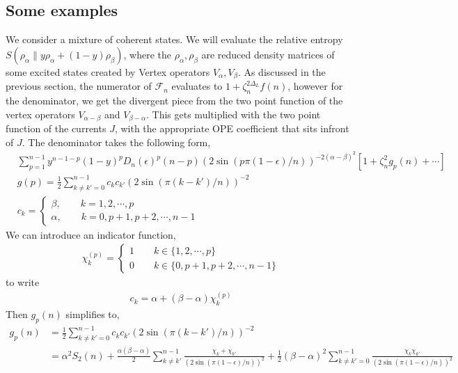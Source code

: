 \documentclass[11pt]{article}
\newcommand{\ep}{\epsilon}
\newcommand{\lb}{\left(}
\newcommand{\rb}{\right)}
\begin{document}
\subsection{Some examples}
We consider a mixture of coherent states. We will evaluate the relative entropy $S(\rho_\alpha \|y\rho_\alpha + (1-y)\rho_\beta)$, where the $\rho_{\alpha},\rho_\beta$ are reduced density matrices of some excited states created by Vertex operators $V_\alpha, V_\beta$. As discussed in the previous section, the numerator of $\mathcal{F}_n$ evaluates to $1+ \zeta_n^{2\Delta_L}f(n)$, however for the denominator, we get the divergent piece from the two point function of the vertex operators $V_{\alpha- \beta}$ and $V_{\beta- \alpha}$. This gets multiplied with the two point function of the currents $J$, with the appropriate OPE coefficient that sits infront of $J$. The denominator takes the following form,
\begin{align}
    &\sum_{p=1}^{n-1} y^{n-1-p} (1-y)^p D_n(\ep)^p (n-p) \lb 2\sin(p\pi(1-\ep)/n)\rb^{-2(\alpha - \beta)^2} \left[  1+ \zeta_n^2 g_p(n) + \cdots  \right]\\
    &g(p) =  \frac{1}{2}\sum_{k\neq k' =0}^{n-1} c_k c_{k'} \lb 2\sin( \pi (k-k')/n )\rb^{-2}\\
    &c_k = \begin{cases}
        \beta , \qquad  k = 1,2,\cdots ,p \\
        \alpha , \qquad k = 0 ,p+1, p+2, \cdots, n-1
    \end{cases}
\end{align}
We can introduce an indicator function,
\begin{align}
    \chi_k^{(p)} = \begin{cases}
        1 \qquad k \in \{ 1, 2 ,\cdots , p\}\\
        0 \qquad k\in \{0,p+1,p+2, \cdots , n-1 \} 
    \end{cases}
\end{align}
to write 
\begin{align}
    c_k = \alpha + (\beta - \alpha)\chi_k^{(p)}
\end{align}
Then $g_p(n)$ simplifies to,
\begin{align}
    g_p(n) &= \frac{1}{2}\sum_{k\neq k' = 0}^{n-1} c_k c_{k'} \lb 2\sin( \pi (k-k')/n )\rb^{-2} \\
    &= \alpha^2 S_2(n) + \frac{\alpha (\beta - \alpha) }{2}\sum_{k\neq k'}^{n-1}\frac{\chi_k + \chi_{k'}}{\lb2\sin (\pi (1-\ep)/n)\rb^2} + \frac{1}{2}(\beta - \alpha)^2 \sum_{k\neq k'=0}^{n-1} \frac{\chi_k \chi_{k'}}{\lb2\sin (\pi (1-\ep)/n)\rb^2}
\end{align}
\end{document}
